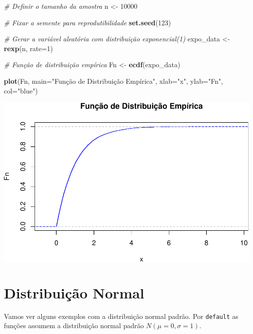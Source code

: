 \documentclass[
]{book}
\newenvironment{Shaded}{\begin{snugshade}}{\end{snugshade}}
\newcommand{\AttributeTok}[1]{\textcolor[rgb]{0.13,0.29,0.53}{#1}}
\newcommand{\CommentTok}[1]{\textcolor[rgb]{0.56,0.35,0.01}{\textit{#1}}}
\newcommand{\DecValTok}[1]{\textcolor[rgb]{0.00,0.00,0.81}{#1}}
\newcommand{\FunctionTok}[1]{\textcolor[rgb]{0.13,0.29,0.53}{\textbf{#1}}}
\newcommand{\NormalTok}[1]{#1}
\newcommand{\OtherTok}[1]{\textcolor[rgb]{0.56,0.35,0.01}{#1}}
\newcommand{\StringTok}[1]{\textcolor[rgb]{0.31,0.60,0.02}{#1}}
\begin{document}
\begin{Shaded}
\begin{Highlighting}[]
\CommentTok{\# Definir o tamanho da amostra}
\NormalTok{n }\OtherTok{\textless{}{-}} \DecValTok{10000}

\CommentTok{\# Fixar a semente para reprodutibilidade}
\FunctionTok{set.seed}\NormalTok{(}\DecValTok{123}\NormalTok{)}

\CommentTok{\# Gerar a variável aleatória com distribuição exponencial(1)}
\NormalTok{expo\_data }\OtherTok{\textless{}{-}} \FunctionTok{rexp}\NormalTok{(n, }\AttributeTok{rate=}\DecValTok{1}\NormalTok{)}

\CommentTok{\# Função de distribuição empírica}
\NormalTok{Fn }\OtherTok{\textless{}{-}} \FunctionTok{ecdf}\NormalTok{(expo\_data)}

\FunctionTok{plot}\NormalTok{(Fn, }\AttributeTok{main=}\StringTok{"Função de Distribuição Empírica"}\NormalTok{,}
     \AttributeTok{xlab=}\StringTok{"x"}\NormalTok{,}
     \AttributeTok{ylab=}\StringTok{"Fn"}\NormalTok{,}
     \AttributeTok{col=}\StringTok{"blue"}\NormalTok{)}
\end{Highlighting}
\end{Shaded}

\includegraphics{introR_files/figure-latex/unnamed-chunk-269-1.pdf}

\section{Distribuição Normal}\label{distribuiuxe7uxe3o-normal}

Vamos ver alguns exemplos com a distribuição normal padrão. Por \texttt{default} as funções assumem a distribuição normal padrão \(N(\mu=0, \sigma = 1)\).
\end{document}

